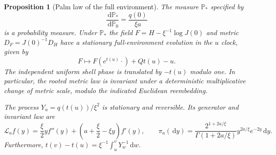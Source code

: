 \documentclass[11pt,reqno]{amsart}
\theoremstyle{plain}
\newtheorem{proposition}[theorem]{Proposition}
\theoremstyle{definition}
\theoremstyle{remark}
\newcommand{\Pp}{\mathbb P}
\newcommand{\1}{\mathbf{1}}
\newcommand{\dd}{\,\mathrm d}
\begin{document}
\begin{proposition}[Palm law of the full environment]\label{prop:palm}
The measure $\Pp_*$ specified by
\begin{equation}\label{eq:palm}
\frac{\dd\Pp_*}{\dd\Pp_0}=\frac{q(0)}{\xi a}
\end{equation}
is a probability measure. Under $\Pp_*$ the field $F=H-\xi^{-1}\log J(0)$ and metric $D_F=J(0)^{-1}D_H$ have a stationary \emph{full-environment} evolution in the $u$ clock, given by
\begin{equation}\label{eq:flow-u}
F\longmapsto F(e^{t(u)}\cdot)+Qt(u)-u.
\end{equation}
The independent uniform shell phase is translated by $-t(u)$ modulo one. In particular, the rooted metric law is invariant under a deterministic multiplicative change of metric scale, modulo the indicated Euclidean reembedding.

The process $Y_u=q(t(u))/\xi^2$ is stationary and reversible. Its generator and invariant law are
\begin{equation}\label{eq:generator}
\mathcal L_af(y)=\frac\xi2 yf''(y)+\left(a+\frac\xi2-\xi y\right)f'(y),
\qquad
\pi_a(\dd y)=\frac{2^{1+2a/\xi}}{\Gamma(1+2a/\xi)}y^{2a/\xi}e^{-2y}\dd y.
\end{equation}
Furthermore, $t(v)-t(u)=\xi^{-1}\int_u^vY_w^{-1}\dd w$.
\end{proposition}
\end{document}
